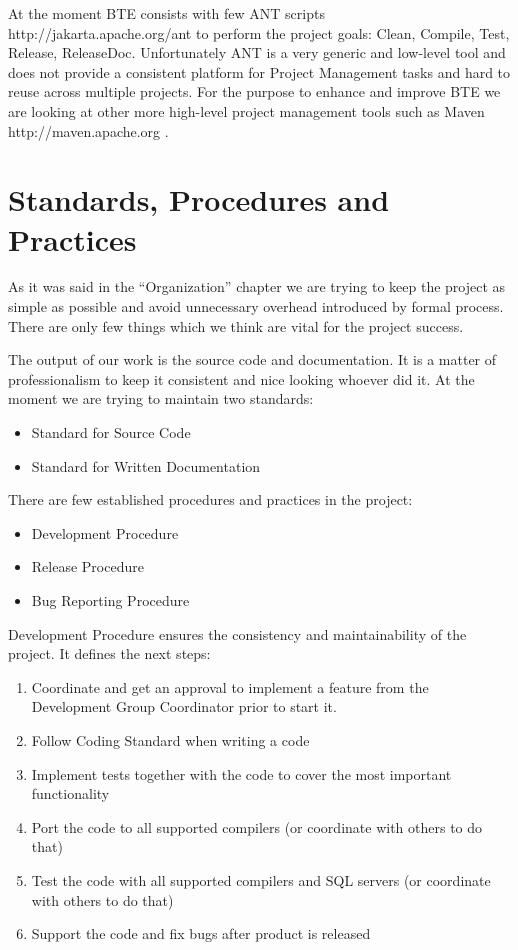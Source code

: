 \documentclass[a4paper,12pt,oneside]{book}
\begin{document}
At the moment BTE consists with few ANT scripts http://jakarta.apache.org/ant to perform the project goals: Clean, Compile, Test, Release, ReleaseDoc.
Unfortunately ANT is a very generic and low-level tool and does not provide a consistent platform for Project Management tasks and hard to reuse across multiple projects.
For the purpose to enhance and improve BTE we are looking at other more high-level project management tools such as Maven http://maven.apache.org .

\section{Standards, Procedures and Practices}
As it was said in the “Organization” chapter we are trying to keep the project as simple as possible and avoid unnecessary overhead introduced by formal process.
There are only few things which we think are vital for the project success.

The output of our work is the source code and documentation.
It is a matter of professionalism to keep it consistent and nice looking whoever did it.
At the moment we are trying to maintain two standards:
\begin{itemize}
  \item Standard for Source Code
	\item Standard for Written Documentation
\end{itemize}

There are few established procedures and practices in the project:
\begin{itemize}
  \item Development Procedure
	\item Release Procedure
	\item Bug Reporting Procedure
\end{itemize}

Development Procedure ensures the consistency and maintainability of the project.
It defines the next steps:
\begin{enumerate}
  \item Coordinate and get an approval to implement a feature from the Development Group Coordinator prior to start it.
	\item Follow Coding Standard when writing a code
	\item Implement tests together with the code to cover the most important functionality
	\item Port the code to all supported compilers (or coordinate with others to do that)
	\item Test the code with all supported compilers and SQL servers (or coordinate with others to do that)
	\item Support the code and fix bugs after product is released
\end{enumerate}
\end{document}
